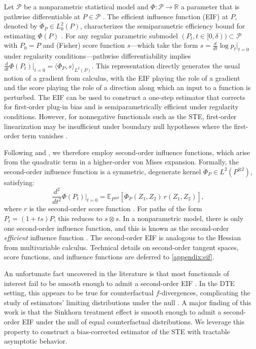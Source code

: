 \documentclass{article}
\theoremstyle{plain}
\theoremstyle{definition}
\theoremstyle{remark}
\newcommand{\R}{\mathbb{R}}
\newcommand{\E}{\mathbb{E}}
\newcommand{\cP}{\mathcal{P}}
\newcommand{\1}{\mathbbm{1}}
\theoremstyle{plain}
\theoremstyle{definition}
\begin{document}
Let $\cP$ be a nonparametric statistical model and $\Phi: \cP \to \R$ a parameter that is pathwise differentiable at $P \in \cP$ \citep{van1991differentiable}. The efficient influence function (EIF) at $P$, denoted by $\dot{\Phi}_P \in L_0^2(P)$, characterizes the semiparametric efficiency bound for estimating $\Phi(P)$ \cite{bickel1993efficient}. 
For any regular parametric submodel $(P_t, t\in[0, \delta)) \subset \cP$ with $P_0 = P$ and (Fisher) score function $s$---which take the form $s= \tfrac{d}{dt} \log p_t \vert_{t=0}$ under regularity conditions---pathwise differentiability implies $\tfrac{d}{dt} \Phi(P_t) \vert_{t=0} = \langle \dot{\Phi}_P, s \rangle_{L^2(P)}$. This representation directly generates the usual notion of a gradient from calculus, with the EIF playing the role of a gradient and the score playing the role of a direction along which an input to a function is perturbed. The EIF can be used to construct a one-step estimator that corrects for first-order plug-in bias and is semiparametrically efficient under regularity conditions. However, for nonnegative functionals such as the STE, first-order linearization may be insufficient under boundary null hypotheses where the first-order term vanishes \citep{luedtke2019omnibus,williamson2023general}.

Following \citet{robins2008higher} and \citet{van2014higher}, we therefore employ second-order influence functions, which arise from the quadratic term in a higher-order von Mises expansion. Formally, the second-order influence function is a symmetric, degenerate kernel $\ddot{\Phi}_P\in L^2(P^{\otimes 2})$, satisfying: 
\[
\frac{d^2}{dt^2} \Phi(P_t) \Big|_{t=0} = \E_{P^{\otimes 2}} [\ddot{\Phi}_P(Z_1,Z_2) \, r(Z_1,Z_2)],
\]
where $r$ is the second-order score function \cite{small2011hilbert}. For paths of the form $P_t = (1+ts)P$, this reduces to $s \otimes s$. In a nonparametric model, there is only one second-order influence function, and this is known as the second-order \emph{efficient} influence function \citep{robins2008higher}. The second-order EIF is analogous to the Hessian from multivariable calculus. Technical details on second-order tangent spaces, score functions, and influence functions are deferred to \cref{appendix:eif}.

An unfortunate fact uncovered in the literature is that most functionals of interest fail to be smooth enough to admit a second-order EIF \citep{robins2008higher,van2014higher}. In the DTE setting, this appears to be true for counterfactual $f$-divergences, complicating the study of estimators' limiting distributions under the null \citep[][Sec. 5.2]{kennedy2023semiparametric}. A major finding of this work is that the Sinkhorn treatment effect is smooth enough to admit a second-order EIF under the null of equal counterfactual distributions. We leverage this property to construct a bias-corrected estimator of the STE with tractable asymptotic behavior.
\end{document}
